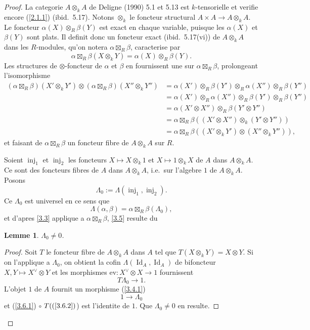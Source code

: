 \documentclass[11pt,a4paper]{article}
\theoremstyle{plain}
\newtheorem{lemma}[theorem]{Lemme}
\theoremstyle{definition}
\DeclareMathOperator{\Id}{Id}
\newcommand{\ev}{\mathrm{ev}}
\newcommand{\inj}{\operatorname{inj}}
\begin{document}
\begin{proof}
La categorie $A\otimes_k A$ de Deligne (1990) 5.1 et 5.13 est $k$-tensorielle et verifie encore (\ref{2.1.1}) (ibid.~5.17). Notons $\otimes_k$ le foncteur structural $A\times A\to A\otimes_k A$. Le foncteur $\alpha(X)\otimes_R\beta(Y)$ est exact en chaque variable, puisque les $\alpha(X)$ et $\beta(Y)$ sont plats. Il definit donc un foncteur exact (ibid.~5.17(vi)) de $A\otimes_k A$ dans les $R$-modules, qu'on notera $\alpha\boxtimes_R\beta$, caracterise par
\[
\alpha\boxtimes_R\beta(X\otimes_k Y)=\alpha(X)\otimes_R\beta(Y).
\]
Les structures de $\otimes$-foncteur de $\alpha$ et $\beta$ en fournissent une sur $\alpha\boxtimes_R\beta$, prolongeant l'isomorphisme
\begin{align*}
(\alpha\boxtimes_R\beta)(X'\otimes_k Y')\otimes(\alpha\boxtimes_R\beta)(X''\otimes_k Y'') &= \alpha(X')\otimes_R\beta(Y')\otimes_R\alpha(X'')\otimes_R\beta(Y'')\\
&=\alpha(X')\otimes_R\alpha(X'')\otimes_R\beta(Y')\otimes_R\beta(Y'')\\
&=\alpha(X'\otimes X'')\otimes_R\beta(Y'\otimes Y'')\\
&=\alpha\boxtimes_R\beta((X'\otimes X'')\otimes_k(Y'\otimes Y''))\\
&=\alpha\boxtimes_R\beta((X'\otimes_k Y')\otimes(X''\otimes_k Y'')),
\end{align*}
et faisant de $\alpha\boxtimes_R\beta$ un foncteur fibre de $A\otimes_k A$ sur $R$.

Soient $\inj_1$ et $\inj_2$ les foncteurs $X\mapsto X\otimes_k1$ et $X\mapsto1\otimes_k X$ de $A$ dans $A\otimes_k A$. Ce sont des foncteurs fibres de $A$ dans $A\otimes_k A$, i.e.~sur l'algebre $1$ de $A\otimes_k A$. Posons
\begin{equation}\label{3.5.1}
\Lambda_0:=\Lambda(\inj_1,\inj_2).
\end{equation}
Ce $\Lambda_0$ est universel en ce sens que
\[
\Lambda(\alpha,\beta)=\alpha\boxtimes_R\beta(\Lambda_0),
\]
et d'apres \ref{3.3} applique a $\alpha\boxtimes_R\beta$, \ref{3.5} resulte du

\begin{lemma}\label{3.6}
$\Lambda_0\neq0$.
\end{lemma}

\begin{proof}
Soit $T$ le foncteur fibre de $A\otimes_k A$ dans $A$ tel que $T(X\otimes_k Y)=X\otimes Y$. Si on l'applique a $\Lambda_0$, on obtient la cofin $\Lambda(\Id_A,\Id_A)$ de bifoncteur $X,Y\mapsto X^\vee\otimes Y$ et les morphismes $\ev:X^\vee\otimes X\to1$ fournissent
\begin{equation}\label{3.6.1}
T\Lambda_0\to1.
\end{equation}
L'objet $1$ de $A$ fournit un morphisme (\ref{3.4.1})
\begin{equation}\label{3.6.2}
1\to\Lambda_0
\end{equation}
et (\ref{3.6.1}) $\circ$ $T((\ref{3.6.2})$) est l'identite de $1$. Que $\Lambda_0\neq0$ en resulte.
\end{proof}
\let\qed\relax
\end{proof}
\end{document}
